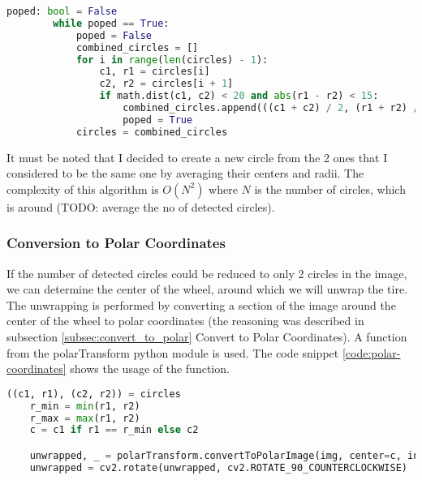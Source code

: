 \begin{lstlisting}[language=Python, label=code:heuristics-for-fircles, caption={Reducing the Number of Circles}]
    poped: bool = False
        while poped == True:
            poped = False
            combined_circles = []
            for i in range(len(circles) - 1):
                c1, r1 = circles[i]
                c2, r2 = circles[i + 1]
                if math.dist(c1, c2) < 20 and abs(r1 - r2) < 15:
                    combined_circles.append(((c1 + c2) / 2, (r1 + r2) / 2))
                    poped = True
            circles = combined_circles
\end{lstlisting}

It must be noted that I decided to create a new circle from the 2 ones that I considered to be the same one by averaging their centers and radii. The complexity of this algorithm is $O(N^2)$ where $N$ is the number of circles, which is around (TODO: average the no of detected circles).

\subsubsection{Conversion to Polar Coordinates}

If the number of detected circles could be reduced to only 2 circles in the image, we can determine the center of the wheel, around which we will unwrap the tire. The unwrapping is performed by converting a section of the image around the center of the wheel to polar coordinates (the reasoning was described in subsection \ref{subsec:convert_to_polar} Convert to Polar Coordinates). A function from the polarTransform \cite{site:polarTransform-convertToPolarImage} python module is used. The code snippet \ref{code:polar-coordinates} shows the usage of the function.

\begin{lstlisting}[language=Python, label=code:polar-coordinates, caption={Polar Coordinates}]
   ((c1, r1), (c2, r2)) = circles
    r_min = min(r1, r2)
    r_max = max(r1, r2)
    c = c1 if r1 == r_min else c2

    unwrapped, _ = polarTransform.convertToPolarImage(img, center=c, initialRadius=r_min, finalRadius=r_max, hasColor=True, order=1, useMultiThreading=True)
    unwrapped = cv2.rotate(unwrapped, cv2.ROTATE_90_COUNTERCLOCKWISE)
\end{lstlisting}

